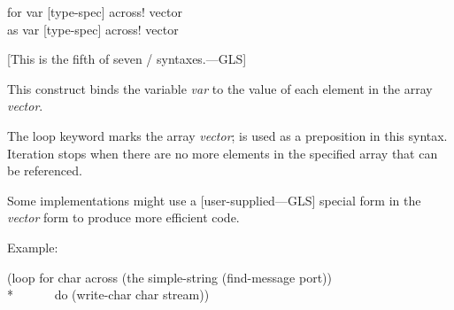 \begin{defloop}
for var [type-spec] \!across! vector \\
as var [type-spec] \!across! vector

[This is the fifth of seven / syntaxes.---GLS]

    This construct binds the variable {\it var\/} to
    the value of each element in the array {\it vector}.

  The loop keyword  marks the array {\it vector}; 
  is used as a preposition in this syntax.
  Iteration stops when there are no more elements in the specified
  array that can be referenced.

  Some implementations might use a [user-supplied---GLS]  special form
  in the {\it vector} form to produce more efficient code.

  Example:
\begin{lisp}
(loop for char across (the simple-string (find-message port)) \\*
~~~~~~do (write-char char stream))
\end{lisp}
\end{defloop}

